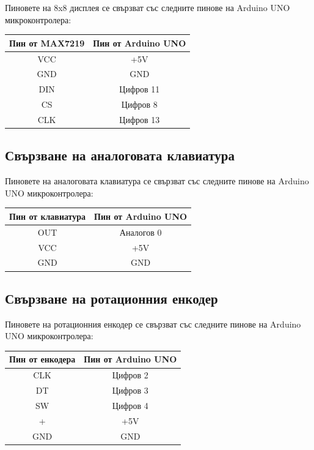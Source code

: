 \documentclass[titlepage, oneside, 14pt]{extbook}
\newcommand{\ard}{Arduino\texttrademark{}}
\begin{document}
Пиновете на 8x8 дисплея се свързват със следните пинове на \ard{} UNO микроконтролера:

\begin{center}
  \begin{tabular}{c|c}
    Пин от MAX7219 & Пин от \ard{} UNO \\ 
    \hline
    VCC & +5V \\  
    GND & GND \\  
    DIN & Цифров 11 \\  
    CS & Цифров 8 \\  
    CLK & Цифров 13
  \end{tabular}
\end{center}

\subsection{Свързване на аналоговата клавиатура}

Пиновете на аналоговата клавиатура се свързват със следните пинове на \ard{} UNO микроконтролера:

\begin{center}
  \begin{tabular}{c|c}
    Пин от клавиатура & Пин от \ard{} UNO \\ 
    \hline
    OUT & Аналогов 0 \\  
    VCC & +5V \\  
    GND & GND
  \end{tabular}
\end{center}

\subsection{Свързване на ротационния енкодер}

Пиновете на ротационния енкодер се свързват със следните пинове на \ard{} UNO микроконтролера:

\begin{center}
  \begin{tabular}{c|c}
    Пин от енкодера & Пин от \ard{} UNO \\ 
    \hline
    CLK & Цифров 2 \\  
    DT & Цифров 3 \\  
    SW & Цифров 4 \\
    + & +5V \\
    GND & GND
  \end{tabular}
\end{center}
\end{document}
